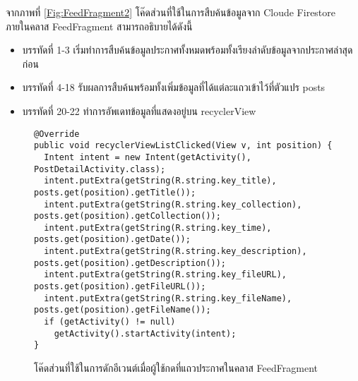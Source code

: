 	จากภาพที่ \ref{Fig:FeedFragment2} โค๊ดส่วนที่ใช้ในการสืบค้นข้อมูลจาก Cloude Firestore ภายในคลาส FeedFragment สามารถอธิบายได้ดังนี้
	\begin{itemize}[label={--}]
		\item บรรทัดที่ 1-3 เริ่มทำการสืบค้นข้อมูลประกาศทั้งหมดพร้อมทั้งเรียงลำดับข้อมูลจากประกาศล่าสุดก่อน
		\item บรรทัดที่ 4-18 รับผลการสืบค้นพร้อมทั้งเพิ่มข้อมูลที่ได้แต่ละแถวเข้าไว้ที่ตัวแปร posts 
		\item บรรทัดที่ 20-22 ทำการอัพเดทข้อมูลที่แสดงอยู่บน recyclerView
	\end{itemize}
	\begin{figure}[H]
		{\begin{lstlisting}
@Override
public void recyclerViewListClicked(View v, int position) {
  Intent intent = new Intent(getActivity(), PostDetailActivity.class);
  intent.putExtra(getString(R.string.key_title), posts.get(position).getTitle());
  intent.putExtra(getString(R.string.key_collection), posts.get(position).getCollection());
  intent.putExtra(getString(R.string.key_time), posts.get(position).getDate());
  intent.putExtra(getString(R.string.key_description), posts.get(position).getDescription());
  intent.putExtra(getString(R.string.key_fileURL), posts.get(position).getFileURL());
  intent.putExtra(getString(R.string.key_fileName), posts.get(position).getFileName());
  if (getActivity() != null)
    getActivity().startActivity(intent);
}
			\end{lstlisting}}
		\caption{โค๊ดส่วนที่ใช้ในการดักอีเวนต์เมื่อผู้ใช้กดที่แถวประกาศในคลาส FeedFragment}
		\label{Fig:FeedFragment3}
	\end{figure}
